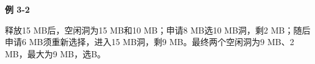 {\color{ink}\bfseries 例 3-2}\par\vspace{1bp}释放15 MB后，空闲洞为15 MB和10 MB；申请8 MB选10 MB洞，剩2 MB；随后申请6 MB须重新选择，进入15 MB洞，剩9 MB。最终两个空闲洞为9 MB、2 MB，最大为9 MB，选B。
